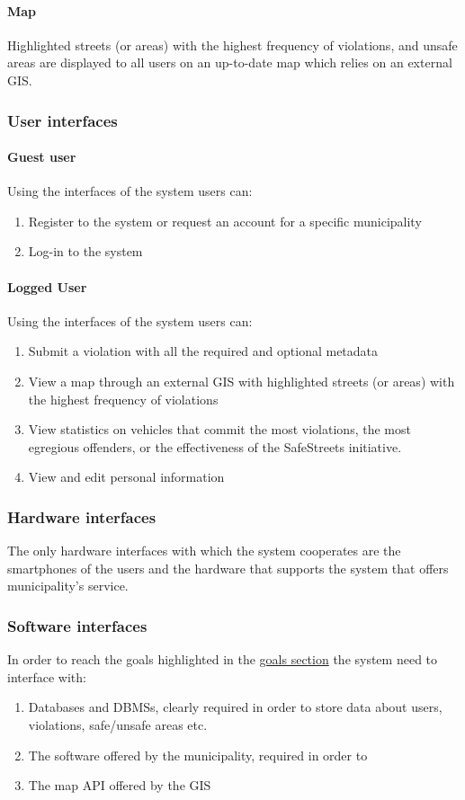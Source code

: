 	\paragraph{Map} Highlighted streets (or areas) with the highest frequency of violations, and unsafe areas are displayed to all users on an up-to-date map which relies on an external GIS.

\subsubsection{User interfaces}		
\paragraph{Guest user}
	Using the interfaces of the system users can:
	\begin{enumerate}
		\item Register to the system or request an account for a specific municipality
		\item Log-in to the system
	\end{enumerate}
\paragraph{Logged User}
	Using the interfaces of the system users can:
	\begin{enumerate}
		\item Submit a violation with all the required and optional metadata
		\item View a map through an external GIS with highlighted streets (or areas) with the highest frequency of violations
		\item View statistics on vehicles that commit the most violations, the most egregious offenders, or the effectiveness of the SafeStreets initiative.
		\item View and edit personal information
	\end{enumerate}
	
\subsubsection{Hardware interfaces}
	The only hardware interfaces with which the system cooperates are the smartphones of the users and the hardware that supports the system that offers municipality's service.
	
\subsubsection{Software interfaces}
	In order to reach the goals highlighted in the \hyperref[sec:goals]{goals section} the system need to interface with:
	\begin{enumerate}
		\item Databases and DBMSs, clearly required in order to store data about users, violations, safe/unsafe areas etc.
		\item The software offered by the municipality, required in order to 
		\item The map API offered by the GIS
	\end{enumerate}
	
